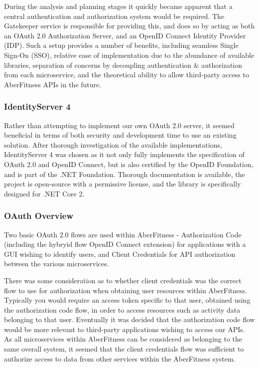 During the analysis and planning stages it quickly became apparent that a central authentication and authorization system would be required.  The Gatekeeper service is responsible for providing this, and does so by acting as both an OAuth 2.0 Authorization Server, and an OpenID Connect Identity Provider (IDP).  Such a setup provides a number of benefits, including seamless Single Sign-On (SSO), relative ease of implementation due to the abundance of available libraries, separation of concerns by decoupling authentication \& authorization from each microservice, and the theoretical ability to allow third-party access to AberFitness APIs in the future.

\subsubsection{IdentityServer 4}

Rather than attempting to implement our own OAuth 2.0 server, it seemed beneficial in terms of both security and development time to use an existing solution.  After thorough investigation of the available implementations, IdentityServer 4 was chosen as it not only fully implements the specification of OAuth 2.0 and OpenID Connect, but is also certified by the OpenID Foundation, and is part of the .NET Foundation.  Thorough documentation is available, the project is open-source with a permissive license, and the library is specifically designed for .NET Core 2.

\subsubsection{OAuth Overview}

Two basic OAuth 2.0 flows are used within AberFitness - Authorization Code (including the hybryid flow OpenID Connect extension) for applications with a GUI wishing to identify users, and Client Credentials for API authorization between the various microservices.




There was some consideration as to whether client credentials was the correct flow to use for authorization when obtaining user resources within AberFitness.  Typically you would require an access token specific to that user, obtained using the authorization code flow, in order to access resources such as activity data belonging to that user.  Eventually it was decided that the authorization code flow would be more relevant to third-party applications wishing to access our APIs.  As all microservices within AberFitness can be considered as belonging to the same overall system, it seemed that the client credentials flow was sufficient to authorize access to data from other services within the AberFitness system.

